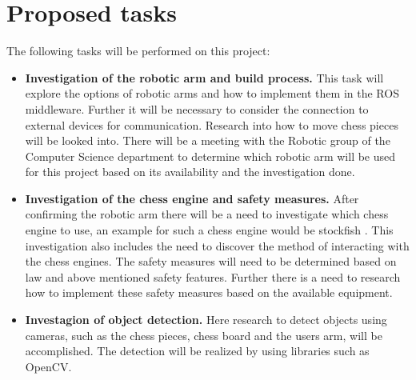 \documentclass[11pt,fleqn,twoside]{article}
\begin{document}
\section{Proposed tasks}
The following tasks will be performed on this project:
\begin{itemize}
    \item \textbf{Investigation of the robotic arm and build process.} This task will explore the options
                  of robotic arms and how to implement them in the ROS middleware. Further it will be necessary 
                  to consider the connection to external devices for communication. Research into how to move 
                  chess pieces will be looked into.\newline
                  There will be a meeting with the Robotic group of the Computer Science department to 
                  determine which robotic arm will be used for this project based on its availability and the 
                  investigation done.\newpage

    \item \textbf{Investigation of the chess engine and safety measures.} After confirming the robotic arm there 
                  will be a need to investigate which chess engine to use, an example for such a chess engine would 
                  be stockfish \cite{stockfish}. This investigation also includes the need to discover the method of interacting with 
                  the chess engines.\newline
                  The safety measures will need to be determined based on law and above mentioned safety features. 
                  Further there is a need to research how to implement these safety measures based on the available 
                  equipment.

    \item \textbf{Investagion of object detection.} Here research to detect objects using cameras, such as 
                  the chess pieces, chess board and the users arm, will be accomplished. The detection will be 
                  realized by using libraries such as OpenCV.
                  

\end{itemize}
\end{document}
